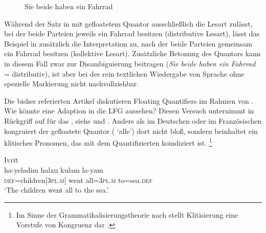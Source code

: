 \begin{figure}
\caption{Sie beide haben ein Fahrrad}
\label{fig:siebeidefhrd_2}
\end{figure}

Während der Satz in  mit gefloatetem Quantor
ausschließlich die Lesart zulässt, bei der beide Parteien jeweils ein Fahrrad
besitzen (distributive Lesart), lässt das Beispiel in
 zusätzlich die Interpretation zu, nach der beide
Parteien gemeinsam ein Fahrrad besitzen (kollektive Lesart). Zusätzliche
Betonung des Quantors kann in diesem Fall zwar zur Disambiguierung beitragen
(\emph{Sie \emph{beide} haben ein Fahrrad} = distributiv), ist aber bei der
rein textlichen Wiedergabe von Sprache ohne spezielle Markierung nicht
nachvollziehbar.

\label{phsec:hebrqf}
Die bisher referierten Artikel diskutieren Floating Quantifiers im Rahmen von
 \autocite{chomsky1981}. Wie könnte eine Adaption in
die LFG aussehen? Diesen Versuch unternimmt \citet{spector2009} in Rückgriff
auf \citet{shlonsky1991} für das , siehe  und
. Anders als im Deutschen oder im
Französischen kongruiert der gefloatete Quantor (
`alle') dort nicht bloß, sondern beinhaltet ein klitisches Pronomen, das mit
dem Quantifizierten koindiziert ist.%
%
	\footnote{Im Sinne der Grammatikalisierungs\-theorie nach
		\citet{lehmann2015} stellt Klitisierung eine Vorstufe von Kongruenz dar
		\autocite[vgl.][44]{lehmann2015}.%
	}

\begin{exe}
\ex \label{ex:hebrqf}
	\langinfo%
		{Ivrit}
		{}
		{\cite[nach][522, 537]{spector2009}}\\
	\gll ha-yeladim halxu kulam la-yam \\
		\textsc{def}=children[\textsc{3pl.m}] went all=\textsc{3pl.m}
			to=sea.\textsc{def} \\
	\trans `The children went all to the sea.'
\end{exe}

